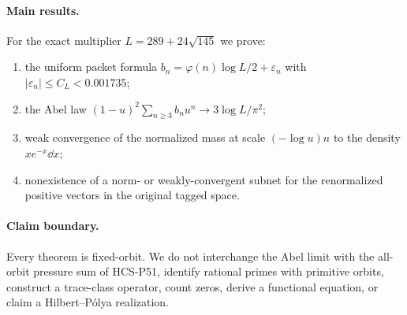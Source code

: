 \paragraph{Main results.}
For the exact multiplier $L=289+24\sqrt{145}$ we prove:
\begin{enumerate}
\item the uniform packet formula
  $b_n=\varphi(n)\log L/2+\varepsilon_n$ with
  $|\varepsilon_n|\le C_L<0.001735$;
\item the Abel law
  $(1-u)^2\sum_{n\ge3}b_nu^n\to3\log L/\pi^2$;
\item weak convergence of the normalized mass at scale
  $(-\log u)n$ to the density $xe^{-x}\dd x$;
\item nonexistence of a norm- or weakly-convergent subnet for the
  renormalized positive vectors in the original tagged space.
\end{enumerate}

\paragraph{Claim boundary.}
Every theorem is fixed-orbit.  We do not interchange the Abel limit with the
all-orbit pressure sum of HCS-P51, identify rational primes with primitive
orbits, construct a trace-class operator, count zeros, derive a functional
equation, or claim a Hilbert--P\'olya realization.
